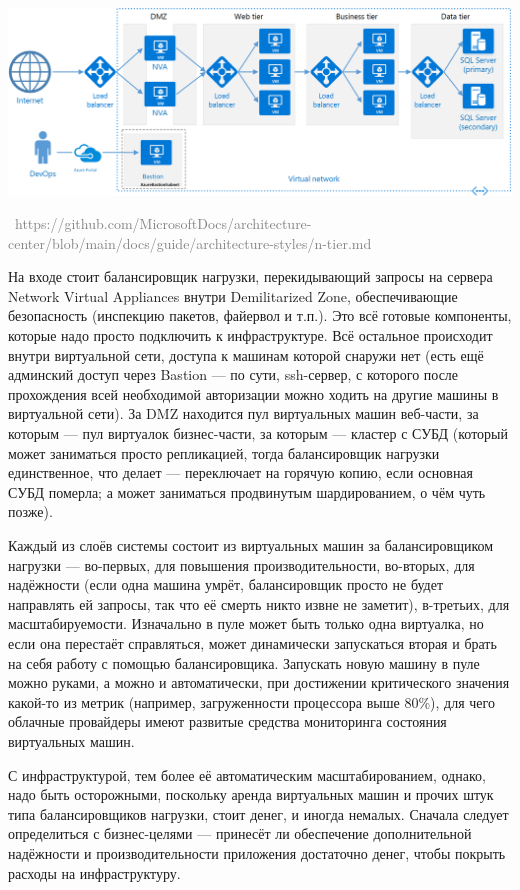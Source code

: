 \documentclass[a5paper]{article}
\newcommand{\attribution}[1] {
    \vspace{-5mm}\begin{flushright}\begin{scriptsize}\textcolor{gray}{\textcopyright\, #1}\end{scriptsize}\end{flushright}
}
\begin{document}
\begin{center}
    \includegraphics[width=\textwidth]{n-tier-physical-bastion.png}
    \attribution{https://github.com/MicrosoftDocs/architecture-center/blob/main/docs/guide/architecture-styles/n-tier.md}
\end{center}

На входе стоит балансировщик нагрузки, перекидывающий запросы на сервера Network Virtual Appliances внутри Demilitarized Zone, обеспечивающие безопасность (инспекцию пакетов, файервол и т.п.). Это всё готовые компоненты, которые надо просто подключить к инфраструктуре. Всё остальное происходит внутри виртуальной сети, доступа к машинам которой снаружи нет (есть ещё админский доступ через Bastion --- по сути, ssh-сервер, с которого после прохождения всей необходимой авторизации можно ходить на другие машины в виртуальной сети). За DMZ находится пул виртуальных машин веб-части, за которым --- пул виртуалок бизнес-части, за которым --- кластер с СУБД (который может заниматься просто репликацией, тогда балансировщик нагрузки единственное, что делает --- переключает на горячую копию, если основная СУБД померла; а может заниматься продвинутым шардированием, о чём чуть позже). 

Каждый из слоёв системы состоит из виртуальных машин за балансировщиком нагрузки --- во-первых, для повышения производительности, во-вторых, для надёжности (если одна машина умрёт, балансировщик просто не будет направлять ей запросы, так что её смерть никто извне не заметит), в-третьих, для масштабируемости. Изначально в пуле может быть только одна виртуалка, но если она перестаёт справляться, может динамически запускаться вторая и брать на себя работу с помощью балансировщика. Запускать новую машину в пуле можно руками, а можно и автоматически, при достижении критического значения какой-то из метрик (например, загруженности процессора выше 80\%), для чего облачные провайдеры имеют развитые средства мониторинга состояния виртуальных машин.

С инфраструктурой, тем более её автоматическим масштабированием, однако, надо быть осторожными, поскольку аренда виртуальных машин и прочих штук типа балансировщиков нагрузки, стоит денег, и иногда немалых. Сначала следует определиться с бизнес-целями --- принесёт ли обеспечение дополнительной надёжности и производительности приложения достаточно денег, чтобы покрыть расходы на инфраструктуру.
\end{document}
